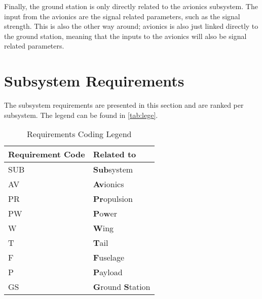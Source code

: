 Finally, the ground station is only directly related to the avionics subsystem. The input from the avionics are the signal related parameters, such as the signal strength. This is also the other way around; avionics is also just linked directly to the ground station, meaning that the inputs to the avionics will also be signal related parameters.






\newpage


\label{N2}

\section{Subsystem Requirements}
\label{sec:subs_requ}

The subsystem requirements are presented in this section and are ranked per subsystem. The legend can be found in \autoref{tab:lege}.

\begin{table}[h]
\centering
\caption{Requirements Coding Legend}
\label{tab:lege}
\begin{tabular}{ll}
\toprule
\textbf{Requirement Code} & \textbf{Related to}                       \\\midrule
SUB                       & \textbf{Sub}system                                         \\\hdashline
AV                         & \textbf{Av}ionics                                         \\\hdashline
PR                         & \textbf{Pr}opulsion                                      \\\hdashline
PW                         & \textbf{P}o\textbf{w}er                                 \\\hdashline
W                         & \textbf{W}ing                          \\\hdashline
T                       & \textbf{T}ail       \\\hdashline
F                        & \textbf{F}uselage                      \\\hdashline
P                        & \textbf{P}ayload                      \\\hdashline
GS                        & \textbf{G}round \textbf{S}tation                          \\\bottomrule
\end{tabular}
\end{table}

